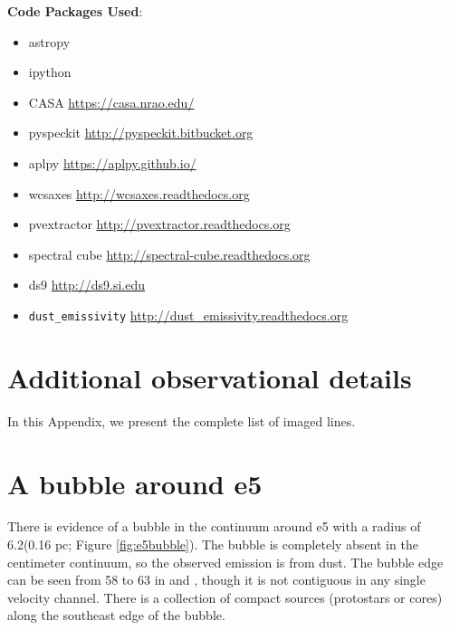 \documentclass{emulateapj}
\begin{document}
\textbf{Code Packages Used}:

\begin{itemize}
    \item astropy \citep{Astropy-Collaboration2013a}
    \item ipython \citep{Perez2007a}
    \item CASA \url{https://casa.nrao.edu/}
    \item pyspeckit \url{http://pyspeckit.bitbucket.org} \citet{Ginsburg2011c}
    \item aplpy \url{https://aplpy.github.io/}
    \item wcsaxes \url{http://wcsaxes.readthedocs.org}
    \item pvextractor \url{http://pvextractor.readthedocs.org}
    \item spectral cube \url{http://spectral-cube.readthedocs.org}
    \item ds9 \url{http://ds9.si.edu}
    \item \texttt{dust\_emissivity} \url{http://dust\_emissivity.readthedocs.org}
\end{itemize}




\appendix

\section{Additional observational details}
In this Appendix, we present the complete list of imaged lines.



%
%
%
%
%
%
%

\section{A bubble around e5}
\label{sec:e5bubble}
There is evidence of a bubble in the continuum around e5 with a radius of
6.2\arcsec (0.16 pc; Figure \ref{fig:e5bubble}).  The bubble is completely
absent in the centimeter continuum, so the observed emission is from dust.  The
bubble edge can be seen from 58 \kms to 63 \kms in \ceighteeno and
\formaldehyde, though it is not contiguous in any single velocity channel.
There is a collection of compact sources (protostars or cores) along the
southeast edge of the bubble.
\end{document}

